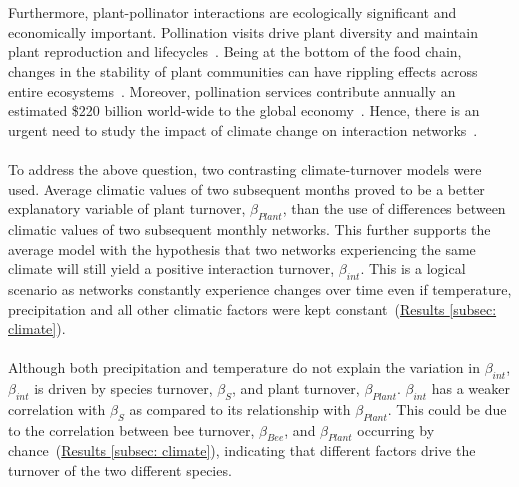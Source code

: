 \documentclass[11pt]{article}
\begin{document}
\\
\\
Furthermore, plant-pollinator interactions are ecologically significant and economically important. Pollination visits drive plant diversity and maintain plant reproduction and lifecycles~\citep{Olesen2008}. Being at the bottom of the food chain, changes in the stability of plant communities can have rippling effects across entire ecosystems~\citep{Scaven2013}. Moreover, pollination services contribute annually an estimated \$220 billion world-wide to the global economy~\citep{Gallai2009}. Hence, there is an urgent need to study the impact of climate change on interaction networks~\citep{Scaven2013}.\\
\\
To address the above question, two contrasting climate-turnover models were used. Average climatic values of two subsequent months proved to be a better explanatory variable of plant turnover, $\beta_{Plant}$, than the use of differences between climatic values of two subsequent monthly networks. This further supports the average model with the hypothesis that two networks experiencing the same climate will still yield a positive interaction turnover, $\beta_{int}$. This is a logical scenario as networks constantly experience changes over time even if temperature, precipitation and all other climatic factors were kept constant~(\hyperref[subsec: climate]{Results \ref{subsec: climate}}).\\
\\
Although both precipitation and temperature do not explain the variation in $\beta_{int}$, $\beta_{int}$ is driven by species turnover, $\beta_{S}$, and plant turnover, $\beta_{Plant}$. $\beta_{int}$ has a weaker correlation with $\beta_{S}$ as compared to its relationship with $\beta_{Plant}$. This could be due to the correlation between bee turnover, $\beta_{Bee}$, and $\beta_{Plant}$ occurring by chance~(\hyperref[subsec: climate]{Results \ref{subsec: climate}}), indicating that different factors drive the turnover of the two different species. \\
\\
\end{document}
